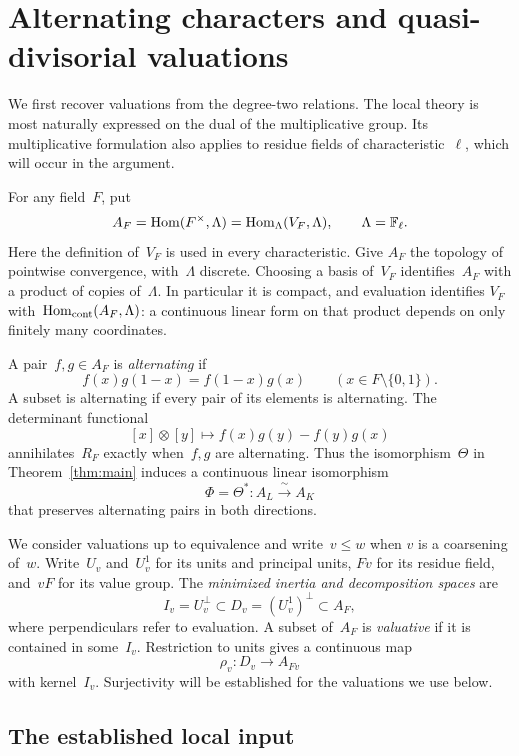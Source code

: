 \section{Alternating characters and quasi-divisorial valuations}
\label{sec:local}

We first recover valuations from the degree-two relations.  The local
theory is most naturally expressed on the dual of the multiplicative
group.  Its multiplicative formulation also applies to residue fields
of characteristic~\(\ell\), which will occur in the argument.

For any field~\(F\), put
\[
 A_F=\operatorname{Hom}(F^\times,\Lambda)
     =\operatorname{Hom}_\Lambda(V_F,\Lambda),\qquad \Lambda=\mathbb F_\ell.
\]
Here the definition of~\(V_F\) is used in every characteristic.  Give
\(A_F\) the topology of pointwise convergence, with~\(\Lambda\) discrete.
Choosing a basis of~\(V_F\) identifies~\(A_F\) with a product of copies
of~\(\Lambda\).  In particular it is compact, and evaluation identifies
\(V_F\) with~\(\operatorname{Hom}_{\mathrm{cont}}(A_F,\Lambda)\): a continuous linear
form on that product depends on only finitely many coordinates.

A pair~\(f,g\in A_F\) is \emph{alternating} if
\begin{equation}
 f(x)g(1-x)=f(1-x)g(x)\qquad(x\in F\setminus\{0,1\}).
 \label{eq:local-alternating}
\end{equation}
A subset is alternating if every pair of its elements is alternating.
The determinant functional
\[
 [x]\otimes[y]\longmapsto f(x)g(y)-f(y)g(x)
\]
annihilates~\(R_F\) exactly when~\(f,g\) are alternating.  Thus the
isomorphism~\(\Theta\) in Theorem~\ref{thm:main} induces a continuous
linear isomorphism
\[
 \Phi=\Theta^*:A_L\xrightarrow{\ \sim\ }A_K
\]
that preserves alternating pairs in both directions.

We consider valuations up to equivalence and write~\(v\leq w\) when
\(v\) is a coarsening of~\(w\).  Write~\(U_v\) and~\(U_v^1\) for its
units and principal units, \(Fv\) for its residue field, and~\(vF\) for
its value group.  The \emph{minimized inertia and decomposition spaces}
are
\[
 I_v=U_v^\perp\subset D_v=(U_v^1)^\perp\subset A_F,
\]
where perpendiculars refer to evaluation.  A subset of~\(A_F\) is
\emph{valuative} if it is contained in some~\(I_v\).  Restriction to
units gives a continuous map
\[
 \rho_v:D_v\longrightarrow A_{Fv}
\]
with kernel~\(I_v\).  Surjectivity will be established for the valuations
we use below.

\subsection{The established local input}

